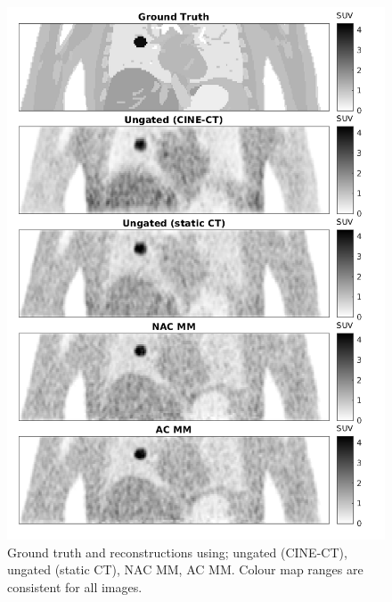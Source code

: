             \begin{figure}
                \centering
                
                \includegraphics[width=1.0\linewidth]{figures/motion_correction_results_2_visual_analysis.png}
                
                \captionsetup{singlelinecheck=false, justification=centering}
                \caption{Ground truth and reconstructions using; ungated (CINE-\gls{CT}), ungated (static \gls{CT}), \gls{NAC} \gls{MM}, \gls{AC} \gls{MM}. Colour map ranges are consistent for all images.}
                \label{fig:pet_ct_respiratory_motion_correction_with_a_single_attenuation_map_using_nac_derived_deformation_fields_results_visual_analysis}
            \end{figure}
            
